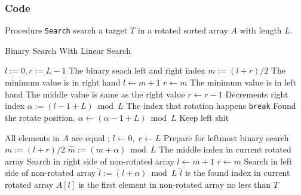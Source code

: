 \subsubsection{Code}
Procedure \texttt{Search} search a target $T$ in a rotated sorted array $A$ with length $L$.
\setcounter{algorithm}{0}
\begin{algorithm}[H]
\caption{Binary Search With Linear Search}
\begin{algorithmic}[1]
\State $l:=0, r:=L-1$ \Comment The binary seach left and right index
\State $m:=(l+r)/2$
 \Comment The minimum value is in right hand
\State $l\gets m+1$
\State $r \gets m$ \Comment The minimum value is in left hand
\Else \Comment The middle value is same as the right value
\State $r\gets r-1$ \Comment Decrements right index
\EndIf
\EndWhile
\State $\alpha:= (l - 1 + L) \bmod L$ \Comment The index that rotation happens
\State \texttt{break} \Comment Found the rotate position.
\Else
\State $\alpha \gets (\alpha-1+L)\bmod L$ \Comment Keep left shit
\end{algorithmic}
\end{algorithm}
\begin{algorithm}[H]
\begin{algorithmic}[1]
\EndIf
\EndWhile
{} \Comment All elements in $A$ are equal
\State {}
\Else
\State {};
\EndIf
\EndIf
\State $l\gets 0,\; r\gets L$ \Comment Prepare for leftmost binary search
\State $m:=(l+r)/2$
\State $\hat{m}:=(m+\alpha)\bmod L$ \Comment The middle index in current rotated array
 \Comment Search in right side of non-rotated array
\State $l\gets m+1$
\Else
\State $r \gets m$ \Comment Search in left side of non-rotated array
\EndIf
\EndWhile
\State $\hat{l}:=(l+\alpha)\bmod L$ \Comment $\hat{l}$ is the found index in current rotated array
 \Comment $A[l]$ is the first element in non-rotated array no less than $T$
\State {}
\Else
\State {}
\EndIf
\EndProcedure
\end{algorithmic}
\end{algorithm}